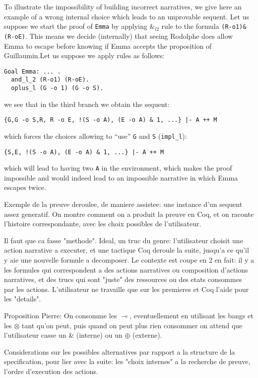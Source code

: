 \documentclass[runningheads,a4paper]{llncs}
\begin{document}
To illustrate the impossibility of building incorrect narratives, we
give here an example of a wrong internal choice which leads to an
unprovable sequent. Let us suppose we start the proof of \texttt{Emma}
by applying $\&_{l2}$ rule to the formula \lstinline!(R-o1)&(R-oE)!.
This means we decide (internally) that seeing Rodolphe does allow Emma
to escape before knowing if Emma accepts the proposition of
Guillaumin.Let us suppose we apply rules as follows:
\begin{lstlisting}
Goal Emma: ... .
  and_l_2 (R-o1) (R-oE).
  oplus_l (G -o 1) (G -o S).
\end{lstlisting}
we see that in the third branch we obtain the sequent:
\begin{lstlisting}
{G,G -o S,R, R -o E, !(S -o A), (E -o A) & 1, ...} |- A ++ M
\end{lstlisting}
which forces the choices allowing to ``use'' \texttt{G} and \texttt{S}
(\lstinline!impl_l!):
\begin{lstlisting}
{S,E, !(S -o A), (E -o A) & 1, ...} |- A ++ M
\end{lstlisting}
which will lead to having two \texttt{A} in the environment, which
makes the proof impossible and would indeed lead to an impossible
narrative in which Emma escapes twice.


Exemple de la preuve deroulee, de maniere assistee: une instance d'un sequent assez generatif. On montre comment on a produit la preuve en Coq, et on raconte l'histoire correspondante, avec les choix possibles de l'utilisateur. 

Il faut que ca fasse "methode". Ideal, un truc du genre: l'utilisateur
choisit une action narrative a executer, et une tactique Coq deroule
la suite, jusqu'a ce qu'il y aie une nouvelle formule a decomposer. Le
contexte est coupe en 2 en fait: il y a les formules qui correspondent
a des actions narratives ou composition d'actions narratives, et des
trucs qui sont "juste" des ressources ou des etats consommes par les
actions. L'utilisateur ne travaille que sur les premieres et Coq
l'aide pour les "details".

Proposition Pierre: On consomme les $\multimap$, eventuellement en
utilisant les bangs et les $\otimes$ tant qu'on peut, puis quand on
peut plus rien consommer on attend que l'utilisateur casse un \&
(interne) ou un $\oplus$ (externe).

Considerations sur les possibles alternatives par rapport a la structure de la specification, pour lier avec la suite: les "choix internes" a la recherche de preuve, l'ordre d'execution des actions. 
\end{document}
